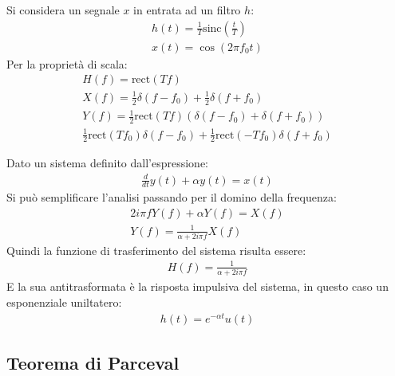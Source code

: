 \documentclass{article}
\numberwithin{equation}{subsection}
\begin{document}
Si considera un segnale $x$ in entrata ad un filtro $h$:
\begin{gather*}
    h(t)=\displaystyle\frac{1}{T}\mbox{sinc}\left(\frac{t}{T}\right)\\
    x(t)=\cos(2\pi f_0t)
\end{gather*}
Per la proprietà di scala:
\begin{gather*}
    H(f)=\mbox{rect}(Tf)\\
    X(f)=\displaystyle\frac{1}{2}\delta(f-f_0)+\frac{1}{2}\delta(f+f_0)\\
    Y(f)=\frac{1}{2}\mbox{rect}(Tf)(\delta(f-f_0)+\delta(f+f_0))\\
    \displaystyle\frac{1}{2}\mbox{rect}(Tf_0)\delta(f-f_0)+\frac{1}{2}\mbox{rect}(-Tf_0)\delta(f+f_0)
\end{gather*}


Dato un sistema definito dall'espressione:
\begin{gather*}
    \displaystyle\frac{d}{dt}y(t)+\alpha y(t)=x(t)
\end{gather*}
Si può semplificare l'analisi passando per il domino della frequenza: 
\begin{gather*}
    2i\pi fY(f)+\alpha Y(f)=X(f)\\
    Y(f)=\displaystyle\frac{1}{\alpha+2i\pi f}X(f)
\end{gather*}
Quindi la funzione di trasferimento del sistema risulta essere:
\begin{gather*}
    H(f)=\displaystyle\frac{1}{\alpha+2i\pi f}
\end{gather*}
E la sua antitrasformata è la risposta impulsiva del sistema, in questo caso un esponenziale uniltatero: 
\begin{gather*}
    h(t)=e^{-\alpha t}u(t)
\end{gather*}

\subsection{Teorema di Parceval}
\end{document}
